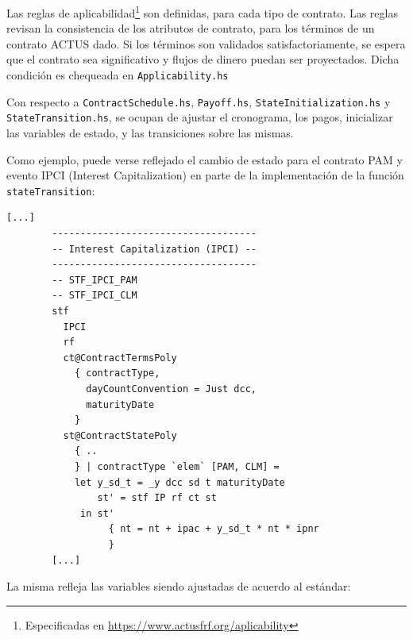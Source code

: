 \documentclass[12pt]{book}
\begin{document}

Las reglas de aplicabilidad\footnote{Especificadas en \url{https://www.actusfrf.org/aplicability}} son definidas, para cada tipo de contrato. Las reglas revisan la consistencia de los atributos de contrato, para los términos de un contrato ACTUS dado. Si los términos son validados satisfactoriamente, se espera que el contrato sea significativo y flujos de dinero puedan ser proyectados. Dicha condición es chequeada en \texttt{Applicability.hs}

Con respecto a \texttt{ContractSchedule.hs}, \texttt{Payoff.hs}, \texttt{StateInitialization.hs} y\\ \texttt{StateTransition.hs}, se ocupan de ajustar el cronograma, los pagos, inicializar las variables de estado, y las transiciones sobre las mismas.

Como ejemplo, puede verse reflejado el cambio de estado para el contrato PAM y evento IPCI (Interest Capitalization) en parte de la implementación de la función \texttt{stateTransition}:

\begin{lstlisting}[style=Haskell-cardano, caption=Parte de la función que modela la transicción de estados.]
        [...]
        ------------------------------------
        -- Interest Capitalization (IPCI) --
        ------------------------------------
        -- STF_IPCI_PAM
        -- STF_IPCI_CLM
        stf
          IPCI
          rf
          ct@ContractTermsPoly
            { contractType,
              dayCountConvention = Just dcc,
              maturityDate
            }
          st@ContractStatePoly
            { ..
            } | contractType `elem` [PAM, CLM] =
            let y_sd_t = _y dcc sd t maturityDate
                st' = stf IP rf ct st
             in st'
                  { nt = nt + ipac + y_sd_t * nt * ipnr
                  }
        [...]
\end{lstlisting}

La misma refleja las variables siendo ajustadas de acuerdo al estándar:

\begingroup
\fontsize{9pt}{9pt}\selectfont
\end{document}
